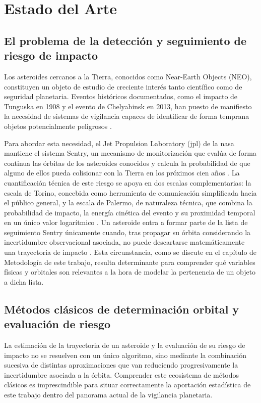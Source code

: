 \documentclass[12pt]{report} %
\begin{document}
\chapter{Estado del Arte}  

\section{El problema de la detección y seguimiento de riesgo de impacto}

Los asteroides cercanos a la Tierra, conocidos como Near-Earth Objects (NEO), constituyen un objeto de estudio de creciente interés tanto científico como de seguridad planetaria. Eventos históricos documentados, como el impacto de Tunguska en 1908 y el evento de Chelyabinsk en 2013, han puesto de manifiesto la necesidad de sistemas de vigilancia capaces de identificar de forma temprana objetos potencialmente peligrosos \cite{mondal2025multimodel}.

Para abordar esta necesidad, el Jet Propulsion Laboratory (\gls{jpl}) de la \gls{nasa} mantiene el sistema Sentry, un mecanismo de monitorización que evalúa de forma continua las órbitas de los asteroides conocidos y calcula la probabilidad de que alguno de ellos pueda colisionar con la Tierra en los próximos cien años \cite{cneos_sentry_intro}. La cuantificación técnica de este riesgo se apoya en dos escalas complementarias: la escala de Torino, concebida como herramienta de comunicación simplificada hacia el público general, y la escala de Palermo, de naturaleza técnica, que combina la probabilidad de impacto, la energía cinética del evento y su proximidad temporal en un único valor logarítmico \cite{chesley2002palermo}. Un asteroide entra a formar parte de la lista de seguimiento Sentry únicamente cuando, tras propagar su órbita considerando la incertidumbre observacional asociada, no puede descartarse matemáticamente una trayectoria de impacto \cite{cneos_sentry_intro}. Esta circunstancia, como se discute en el capítulo de Metodología de este trabajo, resulta determinante para comprender qué variables físicas y orbitales son relevantes a la hora de modelar la pertenencia de un objeto a dicha lista.

\section{Métodos clásicos de determinación orbital y evaluación de riesgo}
 
La estimación de la trayectoria de un asteroide y la evaluación de su riesgo de impacto no se resuelven con un único algoritmo, sino mediante la combinación sucesiva de distintas aproximaciones que van reduciendo progresivamente la incertidumbre asociada a la órbita. Comprender este ecosistema de métodos clásicos es imprescindible para situar correctamente la aportación estadística de este trabajo dentro del panorama actual de la vigilancia planetaria.
 
\end{document}
